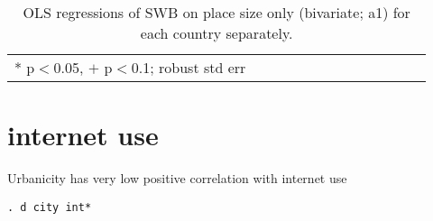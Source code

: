 \documentclass[10pt, letterpaper]{article}
\begin{document}
\begin{spacing}{1.4}
\begin{spacing}{.9} \begin{table}[H]\centering   \begin{scriptsize} \begin{tabular}{p{.5in}p{.5in}p{.5in}p{.5in}p{.5in}p{.5in}p{.5in}p{.5in}p{.5in}p{.5in}p{.5
                                                                      in}p{.5in}p{.5
                                                                      in}}\hline
                                                                      
                                                                      \hline *
                                                                      p$<$0.05,
                                                                      $+$
                                                                      p$<$0.1;
                                                                      robust std
                                                                      err \end{tabular}\end{scriptsize}\caption{\label{d1}OLS
                                                                    regressions
                                                                    of SWB on
                                                                    place size
                                                                    only
                                                                    (bivariate; a1)
                                                                    for each
                                                                    country
                                                                    separately. 
                                                                  }\end{table} \end{spacing}


\section{internet use}

Urbanicity has very low positive correlation with internet use

\begin{spacing}{.5}
\begin{scriptsize}
\begin{verbatim}
. d city int*


\end{verbatim}
\end{scriptsize}
\end{spacing}
\end{spacing}
\end{document}
